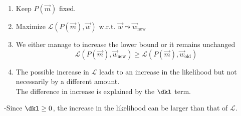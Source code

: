 \begin{frame}{\subsubsecname}

\svspace{-3mm}

\svspace{-5mm}

\begin{enumerate}
\item Keep $P(\vec m)$ fixed.
\item Maximize $\mathscr{L}(P(\vec m), \vec w)$ w.r.t. $\vec w \leadsto \vec w_{\text{new}}$

\pause

\item We either manage to increase the lower bound or it remains unchanged
\begin{equation}
\mathscr{L}(P(\vec m), \vec w_{\text{new}}) \ge \mathscr{L}(P(\vec m), \vec w_{\text{old}})
\end{equation}
\item The possible increase in $\mathscr{L}$ leads to an increase in the likelihood but not necessarily by a different amount.\\
The difference in increase is explained by the $\dkl$ term.
\end{enumerate}

\pause


\pause

-Since $\dkl \ge 0$, the increase in the likelihood can be larger than that of $\mathscr{L}$.

\end{frame}

